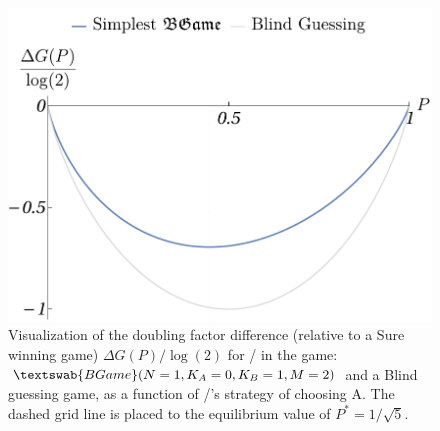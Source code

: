 \documentclass{beamer}
\theoremstyle{definition}
\newcommand{\BG}[1]{$\textswab{BGame}(#1)$}
\begin{document}
\begin{frame}{}

\begin{figure}[H]
    \centering
    \includegraphics[scale=0.5]{img/G_BG_1_0_1_2.pdf}
    \caption{Visualization of the doubling factor difference (relative to a Sure winning game) $\Delta G(P)/\log(2)$ for \PI/ in the game: \BG{N=1,K_A=0,K_B=1,M=2} and a Blind guessing game, as a function of \PII/'s strategy of choosing A. The dashed grid line is placed to the equilibrium value of $P^*=1/\sqrt{5}$.}
    \label{fig:GainPlot1012}
\end{figure}

\end{frame}
\end{document}
